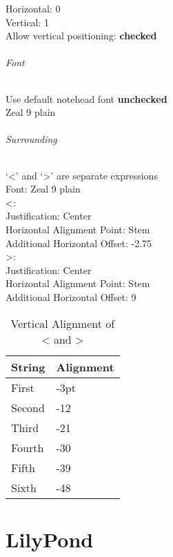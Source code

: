 \documentclass[]{memoir}
\begin{document}
Horizontal: 0\\
Vertical: 1\\
Allow vertical positioning: \textbf{checked}

\paragraph{Font}
\label{sec:font}

Use default notehead font \textbf{unchecked}\\
Zeal 9 plain

\paragraph{Surrounding}
\label{sec:surrounding}

`<' and `>' are separate expressions\\
Font: Zeal 9 plain\\

<:\\
\indent Justification: Center\\
\indent Horizontal Alignment Point: Stem\\
\indent Additional Horizontal Offset: -2.75\\

>:\\
\indent Justification: Center\\
\indent Horizontal Alignment Point: Stem\\
\indent Additional Horizontal Offset: 9\\

\begin{table}[h!]
  \centering
  \begin{tabular}{l l}
    String & Alignment\\\hline
    First & -3pt\\
    Second & -12\\
    Third & -21\\
    Fourth & -30\\
    Fifth & -39\\
    Sixth & -48\\
  \end{tabular}
  \caption{Vertical Alignment of < and >}
\end{table}

\part{LilyPond}
\label{part:lilypond}
\end{document}
